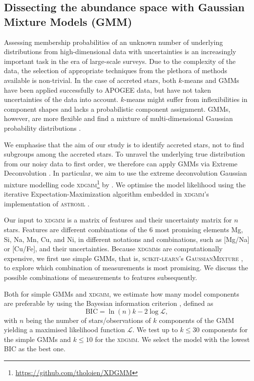 \documentclass[fleqn,usenatbib]{mnras}
\begin{document}
\subsection{Dissecting the abundance space with Gaussian Mixture Models (GMM)} \label{sec:gaussian_mixture_models}

Assessing membership probabilities of an unknown number of underlying distributions from high-dimensional data with uncertainties is an increasingly important task in the era of large-scale surveys. Due to the complexity of the data, the selection of appropriate techniques from the plethora of methods available is non-trivial. In the case of accreted stars, both $k$-means \citep{Hayes2018, Mackereth2019} and GMMs \citep{Das2020} have been applied successfully to APOGEE data, but have not taken uncertainties of the data into account. $k$-means might suffer from inflexibilities in component shapes and lacks a probabilistic component assignment. GMMs, however, are more flexible and find a mixture of multi-dimensional Gaussian probability distributions \citep{VanderPlas2016}.

We emphasise that the aim of our study is to identify accreted stars, not to find subgroups among the accreted stars. To unravel the underlying true distribution from our noisy data to first order, we therefore can apply GMMs via Extreme Deconvolution \citep[XD,][]{Bovy2011}. In particular, we aim to use the extreme deconvolution Gaussian mixture modelling code \textsc{xdgmm}\footnote{\url{https://github.com/tholoien/XDGMM}} by \citet{Holoien2017}. We optimise the model likelihood using the iterative Expectation-Maximization algorithm \citep{Dempster1977} embedded in \textsc{xdgmm}'s implementation of \textsc{astroml} \citep{astroml}.

Our input to \textsc{xdgmm} is a matrix of features and their uncertainty matrix for $n$ stars. Features are different combinations of the 6 most promising elements Mg, Si, Na, Mn, Cu, and Ni, in different notations and combinations, such as [Mg/Na] or [Cu/Fe], and their uncertainties. Because \textsc{xdgmm}s are computationally expensive, we first use simple GMMs, that is, \textsc{scikit-learn}'s \textsc{GaussianMixture} \citep{scikit-learn}, to explore which combination of measurements is most promising. We discuss the possible combinations of measurements to features subsequently.

Both for simple GMMs and \textsc{xdgmm}, we estimate how many model components are preferable by using the Bayesian information criterion \citep[BIC,][]{Schwarz1978}, defined as 
\begin{equation}
\text{BIC} = \ln (n) k - 2 \log \mathcal{L},
\end{equation}
with $n$ being the number of stars/observations of $k$ components of the GMM yielding a maximised likelihood function $\mathcal{L}$. We test up to $k \leq 30$ components for the simple GMMs and $k \leq 10$ for the \textsc{xdgmm}. We select the model with the lowest BIC as the best one.
\end{document}
